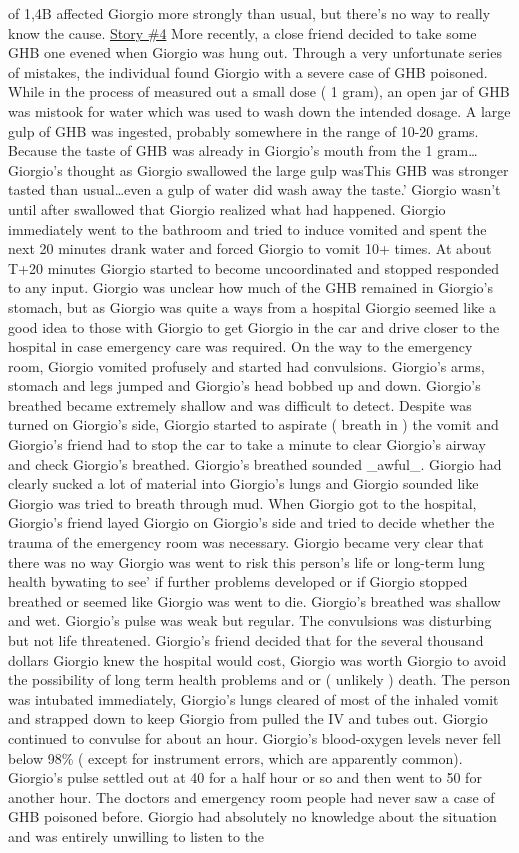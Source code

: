 \documentclass[12pt]{book}
\begin{document}
of 1,4B affected Giorgio more strongly than usual, but there's no way to really know the cause. \underline{Story \#4} More recently, a close friend decided to take some GHB one evened when Giorgio was hung out. Through a very unfortunate series of mistakes, the individual found Giorgio with a severe case of GHB poisoned. While in the process of measured out a small dose ( 1 gram), an open jar of GHB was mistook for water which was used to wash down the intended dosage. A large gulp of GHB was ingested, probably somewhere in the range of 10-20 grams. Because the taste of GHB was already in Giorgio's mouth from the 1 gram\ldots Giorgio's thought as Giorgio swallowed the large gulp wasThis GHB was stronger tasted than usual\ldots even a gulp of water did wash away the taste.' Giorgio wasn't until after swallowed that Giorgio realized what had happened. Giorgio immediately went to the bathroom and tried to induce vomited and spent the next 20 minutes drank water and forced Giorgio to vomit 10+ times. At about T+20 minutes Giorgio started to become uncoordinated and stopped responded to any input. Giorgio was unclear how much of the GHB remained in Giorgio's stomach, but as Giorgio was quite a ways from a hospital Giorgio seemed like a good idea to those with Giorgio to get Giorgio in the car and drive closer to the hospital in case emergency care was required. On the way to the emergency room, Giorgio vomited profusely and started had convulsions. Giorgio's arms, stomach and legs jumped and Giorgio's head bobbed up and down. Giorgio's breathed became extremely shallow and was difficult to detect. Despite was turned on Giorgio's side, Giorgio started to aspirate ( breath in ) the vomit and Giorgio's friend had to stop the car to take a minute to clear Giorgio's airway and check Giorgio's breathed. Giorgio's breathed sounded \_awful\_. Giorgio had clearly sucked a lot of material into Giorgio's lungs and Giorgio sounded like Giorgio was tried to breath through mud. When Giorgio got to the hospital, Giorgio's friend layed Giorgio on Giorgio's side and tried to decide whether the trauma of the emergency room was necessary. Giorgio became very clear that there was no way Giorgio was went to risk this person's life or long-term lung health bywating to see' if further problems developed or if Giorgio stopped breathed or seemed like Giorgio was went to die. Giorgio's breathed was shallow and wet. Giorgio's pulse was weak but regular. The convulsions was disturbing but not life threatened. Giorgio's friend decided that for the several thousand dollars Giorgio knew the hospital would cost, Giorgio was worth Giorgio to avoid the possibility of long term health problems and or ( unlikely ) death. The person was intubated immediately, Giorgio's lungs cleared of most of the inhaled vomit and strapped down to keep Giorgio from pulled the IV and tubes out. Giorgio continued to convulse for about an hour. Giorgio's blood-oxygen levels never fell below 98\% ( except for instrument errors, which are apparently common). Giorgio's pulse settled out at 40 for a half hour or so and then went to 50 for another hour. The doctors and emergency room people had never saw a case of GHB poisoned before. Giorgio had absolutely no knowledge about the situation and was entirely unwilling to listen to the 
\end{document}
